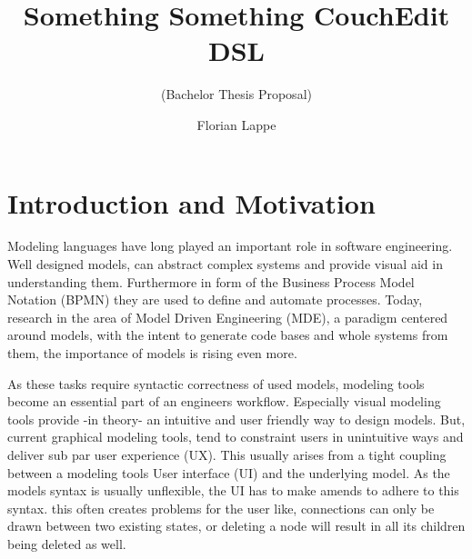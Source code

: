 \documentclass[10pt,a4paper,oneside]{scrartcl}
\title{Something Something CouchEdit DSL}
\subtitle{(Bachelor Thesis Proposal)}
\author{Florian Lappe}
\newcommand\hint[2]{
\ifthenelse{\boolean{showhints}}{
\begin{center}
\colorbox{black!10}{
\begin{minipage}{.963\textwidth}
#2\hfill\textbf{#1}
\end{minipage}
}\end{center}}{}
}
\begin{document}
\maketitle

\section{Introduction and Motivation}
\label{sec:motivation}


    Modeling languages have long played an important role in software engineering. Well designed models, can abstract complex systems and provide visual aid in understanding them. Furthermore in form of the Business Process Model Notation (BPMN) they are used to define and automate processes. Today, research in the area of Model Driven Engineering (MDE), a paradigm centered around models, with the intent to generate code bases and whole systems from them, the importance of models is rising even more.

    As these tasks require syntactic correctness of used models, modeling tools become an essential part of an engineers workflow. Especially visual modeling tools provide -in theory- an intuitive and user friendly way to design models. But, current graphical modeling tools, tend to constraint users in unintuitive ways and deliver sub par user experience (UX). This usually arises from a tight coupling between a modeling tools User interface (UI) and the underlying model. As the models syntax is usually unflexible, the UI has to make amends to adhere to this syntax. this often creates problems for the user like, connections can only be drawn between two existing states, or deleting a node will result in all its children being deleted as well.
\end{document}

